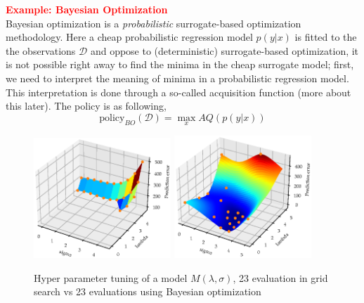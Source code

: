 \begin{tcolorbox}[
    sharp corners,
    boxrule=0mm,
    enhanced,
    borderline west={4pt}{-2pt}{red},
    colframe=drGray,
    colback=drGray,
    coltitle=black,
]
{ \textcolor{red}{\textbf{Example: Bayesian Optimization}}}\\
    Bayesian optimization is a \textit{probabilistic} surrogate-based optimization
    methodology. Here a cheap probabilistic regression model $p(y|x)$ is fitted to the
    the observations $\mathcal{D}$ and oppose to (deterministic) surrogate-based
    optimization, it is not possible right away to find the minima in the cheap
    surrogate model; first, we need to interpret the meaning of minima in a probabilistic
    regression model. This interpretation is done through a so-called acquisition
    function (more about this later). The policy is as following,
    $$\text{policy}_{BO}(\mathcal{D}) = \max_x AQ(p(y|x))$$
\end{tcolorbox}
\begin{figure}[H]%
    \centering
    {\includegraphics[width=0.46\textwidth]{Pictures/BO_vs_Grid2.eps} }%
    \qquad
   {\includegraphics[width=0.46\textwidth]{Pictures/BO_vs_Grid1.eps} }%
    \caption{Hyper parameter tuning of a model $M(\lambda, \sigma)$, 
    23 evaluation in grid search vs 23 evaluations using Bayesian optimization}%
    \label{fig:example}%
\end{figure}

